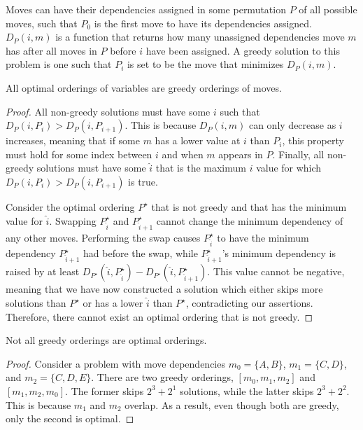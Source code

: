 \documentclass[runningheads,a4paper]{llncs}
\begin{document}
Moves can have their dependencies assigned in some permutation $P$ of all possible moves,
such that $P_0$ is the first move to have its dependencies assigned.
$D_P(i, m)$ is a function that returns how many unassigned dependencies move $m$ has after all
moves in $P$ before $i$ have been assigned. A greedy solution to this problem is one such
that $P_i$ is set to be the move that minimizes $D_P(i, m)$.

\begin{theorem}
All optimal orderings of variables are greedy orderings of moves.
\end{theorem}

\begin{proof}
All non-greedy solutions must have some $i$ such that $D_P(i, P_i) > D_P(i, P_{i+1})$.
This is because $D_P(i, m)$ can only decrease as $i$ increases, meaning that if some $m$
has a lower value at $i$ than $P_i$, this property must hold for
some index between $i$ and when $m$ appears in $P$.
Finally, all non-greedy solutions must have some $\hat{i}$
that is the maximum $i$ value for which $D_P(i, P_i) > D_P(i, P_{i+1})$ is true.

Consider the optimal ordering $P^\star$ that is not greedy and that has the minimum value for $\hat{i}$.
Swapping $P_{\hat{i}}^\star$ and $P_{\hat{i}+1}^\star$ cannot change the minimum dependency of any other moves.
Performing the swap causes $P_{\hat{i}}^\star$ to have the minimum dependency $P_{\hat{i}+1}^\star$ had before
the swap, while $P_{\hat{i}+1}^\star$'s minimum dependency is raised by at least
$D_{P^\star}(\hat{i}, P_{\hat{i}}^\star) - D_{P^\star}(\hat{i}, P_{\hat{i}+1}^\star)$. This value
cannot be negative, meaning that we have now constructed a solution which either skips more
solutions than $P^\star$ or has a lower $\hat{i}$ than $P^\star$, contradicting our assertions.
Therefore, there cannot exist an optimal ordering that is not greedy.
\end{proof}


\begin{theorem}
Not all greedy orderings are optimal orderings.
\end{theorem}

\begin{proof}
Consider a problem with move dependencies $m_0 = \{A, B\}$, $m_1 = \{C, D\}$, and $m_2 = \{C, D, E\}$.
There are two greedy orderings, $[m_0, m_1, m_2]$ and $[m_1, m_2, m_0]$. The former
skips $2^3+2^1$ solutions, while the latter skips $2^3+2^2$. This is because $m_1$ and
$m_2$ overlap. As a result, even though both are greedy, only the second is optimal.
\end{proof}
\end{document}
